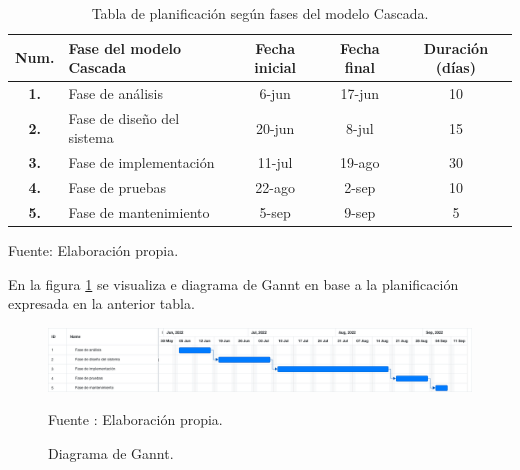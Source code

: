\begin{table}[H]
    \caption{Tabla de planificación según fases del modelo Cascada.}
    \label{tabla:planning}    
    \begin{center}
        \begin{tabular}{|c|l|c|c|c|}
            \hline
            \textbf{Num.} & \textbf{Fase del modelo Cascada}  &  \textbf{Fecha inicial} & \textbf{Fecha final} & \textbf{Duración (días)}\\ \hline
            \textbf{1.} & Fase de análisis        & 6-jun        & 17-jun        & 10        \\ \hline
            \textbf{2.} & Fase de diseño del sistema       & 20-jun        & 8-jul        & 15        \\ \hline
            \textbf{3.} & Fase de implementación        & 11-jul        & 19-ago        & 30        \\ \hline
            \textbf{4.} & Fase de pruebas        & 22-ago         &   2-sep     &    10     \\ \hline
            \textbf{5.} & Fase de mantenimiento        & 5-sep        & 9-sep        & 5        \\ \hline
        \end{tabular}
    \end{center}
    \begin{center}
        Fuente: Elaboración propia.
    \end{center}
\end{table}

En la figura \ref{fig:gannt} se visualiza e diagrama de Gannt en base a la planificación expresada en la anterior tabla.
\begin{figure}[H]
    \begin{center}
        \includegraphics[width=18cm]{img/capitulo_4/gant.png}
    \end{center}
    \begin{center}
        \caption{Diagrama de Gannt.}
        Fuente : Elaboración propia.
        \label{fig:gannt}
    \end{center}
\end{figure}


